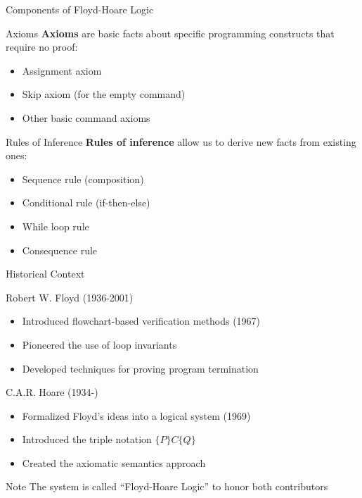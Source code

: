 \begin{frame}{Components of Floyd-Hoare Logic}
    \begin{block}{Axioms}
        \textbf{Axioms} are basic facts about specific programming constructs that require no proof:
        \begin{itemize}
            \item Assignment axiom
            \item Skip axiom (for the empty command)
            \item Other basic command axioms
        \end{itemize}
    \end{block}
    
    \begin{block}{Rules of Inference}
        \textbf{Rules of inference} allow us to derive new facts from existing ones:
        \begin{itemize}
            \item Sequence rule (composition)
            \item Conditional rule (if-then-else)
            \item While loop rule
            \item Consequence rule
        \end{itemize}
    \end{block}
\end{frame}

\begin{frame}{Historical Context}
    \begin{block}{Robert W. Floyd (1936-2001)}
        \begin{itemize}
            \item Introduced flowchart-based verification methods (1967)
            \item Pioneered the use of loop invariants
            \item Developed techniques for proving program termination
        \end{itemize}
    \end{block}
    
    \begin{block}{C.A.R. Hoare (1934-)}
        \begin{itemize}
            \item Formalized Floyd's ideas into a logical system (1969)
            \item Introduced the triple notation $\{P\} C \{Q\}$
            \item Created the axiomatic semantics approach
        \end{itemize}
    \end{block}
    
    \begin{alertblock}{Note}
        The system is called ``Floyd-Hoare Logic'' to honor both contributors
    \end{alertblock}
\end{frame}

